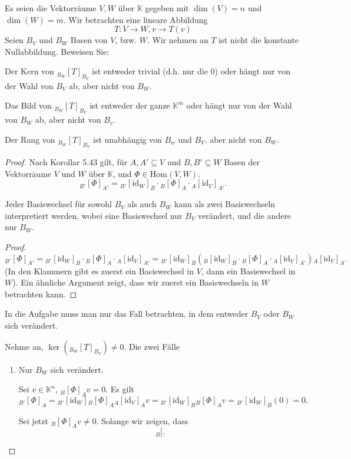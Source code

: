 \begin{Problem}
	Es seien die Vektorräume $V, W$ über $\mathbb{K}$ gegeben mit $\dim(V) = n$ und $\dim(W ) = m$. Wir betrachten eine lineare Abbildung
	\[
	T:V\to W, v\to T(v)\] 
Seien $B_V$ und $B_W$ Basen von $V$, bzw. $W$. Wir nehmen an $T$ ist nicht die konstante Nullabbildung. Beweisen Sie:
\begin{parts}
\item Der Kern von $_{B_W}[T]_{B_V}$ ist entweder trivial (d.h. nur die 0) oder hängt nur von der Wahl von $B_V$ ab, aber nicht von $B_W$.
\item Das Bild von $_{B_W}[T]_{B_V}$ ist entweder der ganze $\mathbb{K}^m$ oder hängt nur von der Wahl von $B_W$ ab, aber nicht von $B_v$. 
\item Der Rang von $_{B_W}[T]_{B_V}$ ist unabh\"{a}ngig von $B_w$ und $B_V$.
aber nicht von $B_W$.
\end{parts}
\end{Problem}
\begin{proof}
Nach Korollar 5.43 gilt, f\"{u}r $A,A' \subseteq V$ und $B,B'\subseteq W$ Basen der Vektorräume $V$ und $W$ über $\mathbb{K}$, und $\Phi\in \text{Hom}(V,W)$.
 \[
	 _{B'}\left[ \Phi \right]_{A'}={}_{B'}[\text{id}_W]_B\cdot{}_B[\Phi]_A\cdot{}_A[\text{id}_V]_{A'}
.\] 
\begin{Lemma}
	Jeder Basiswechsel f\"{u}r sowohl $B_V$ als auch $B_W$ kann als zwei Basiswechseln interpretiert werden, wobei eine Basiswechsel nur $B_V$ verändert, und die andere nur $B_W$.
\end{Lemma}
\begin{proof}
	\[
		_{B'}\left[ \Phi \right]_{A'}={}_{B'}[\text{id}_W]_B\cdot{}_B[\Phi]_A\cdot{}_A[\text{id}_V]_{A'}={}_{B'}[\text{id}_W]_B\left( {}_B[\text{id}_W]_B\cdot {}_B[\Phi]_A\cdot {}_A[\text{id}_V]_{A'} \right) {}_A[\text{id}_V]_A
	.\]
	(In den Klammern gibt es zuerst ein Basiswechsel in $V$, dann ein Basiswechsel in $W$). Ein ähnliche Argument zeigt, dass wir zuerst ein Basiswechseln in $W$ betrachten kann.
\end{proof}
\begin{Corollary}
	In die Aufgabe muss man nur das Fall betrachten, in dem entweder $B_V$ oder $B_W$ sich verändert. 
\end{Corollary}
	\begin{parts}
	\item Nehme an, $\ker({}_{B_W}[T]_{B_V})\neq 0$. Die zwei Fälle
		\begin{enumerate}[label=(\roman*)]
			\item Nur $B_W$ sich verändert.

				Sei $v\in\mathbb{K}^n$, $_B[\Phi]_Av=0$. Es gilt
				\[
					_{B'}[\Phi]_A={}_{B'}[\text{id}_W]{}_B[\Phi]_A{}_A[\text{id}_V]_Av={}_{B'}[\text{id}_W]_B{}_B[\Phi]_Av={}_{B'}[\text{id}_W]_B(0)=0
				.\] 

				Sei jetzt $_B[\Phi]_Av\neq 0$. Solange wir zeigen, dass
				\[
				_B[
				.\] 
		\end{enumerate}
	\end{parts}
\end{proof}

